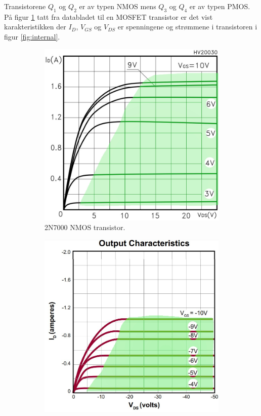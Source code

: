 Transistorene $Q_{1}$ og $Q_{2}$ er av typen NMOS mens $Q_{3}$ og $Q_{4}$ er av typen PMOS. På figur \ref{fig:karakteristikkting} tatt fra databladet \cite{stmicroelectronics_2008_2n7000} til en MOSFET transistor er det vist karakteristikken der $I_D$, $V_{GS}$ og $V_{DS}$ er spenningene og strømmene i transistoren i figur \ref{fig:internal}. 

\begin{figure}[H]
	\centering
	\begin{subfigure}{.5\textwidth}
		\centering
		\includegraphics[scale=0.3]{./Images/02Concept/karakteristikkting.jpg}
		\caption{2N7000 NMOS transistor.\cite{stmicroelectronics_2008_2n7000}}
		\label{fig:karakteristikkting}
	\end{subfigure}%
	\begin{subfigure}{.5\textwidth}
		\centering
		\includegraphics[scale=0.3]{./Images/02Concept/karakteristikkting2.jpg}

\end{subfigure}
\end{figure}
